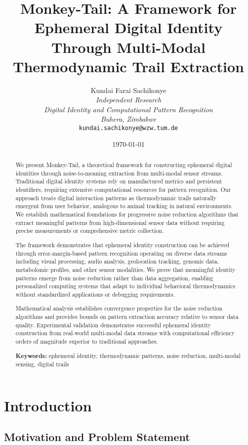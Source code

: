 \documentclass[12pt,a4paper]{article}
\title{\textbf{Monkey-Tail: A Framework for Ephemeral Digital Identity Through Multi-Modal Thermodynamic Trail Extraction}}
\author{
Kundai Farai Sachikonye\\
\textit{Independent Research}\\
\textit{Digital Identity and Computational Pattern Recognition}\\
\textit{Buhera, Zimbabwe}\\
\texttt{kundai.sachikonye@wzw.tum.de}
}
\date{\today}
\begin{document}
\maketitle

\begin{abstract}
We present Monkey-Tail, a theoretical framework for constructing ephemeral digital identities through noise-to-meaning extraction from multi-modal sensor streams. Traditional digital identity systems rely on manufactured metrics and persistent identifiers, requiring extensive computational resources for pattern recognition. Our approach treats digital interaction patterns as thermodynamic trails naturally emergent from user behavior, analogous to animal tracking in natural environments. We establish mathematical foundations for progressive noise reduction algorithms that extract meaningful patterns from high-dimensional sensor data without requiring precise measurements or comprehensive metric collection.

The framework demonstrates that ephemeral identity construction can be achieved through error-margin-based pattern recognition operating on diverse data streams including visual processing, audio analysis, geolocation tracking, genomic data, metabolomic profiles, and other sensor modalities. We prove that meaningful identity patterns emerge from noise reduction rather than data aggregation, enabling personalized computing systems that adapt to individual behavioral thermodynamics without standardized applications or debugging requirements.

Mathematical analysis establishes convergence properties for the noise reduction algorithms and provides bounds on pattern extraction accuracy relative to sensor data quality. Experimental validation demonstrates successful ephemeral identity construction from real-world multi-modal data streams with computational efficiency orders of magnitude superior to traditional approaches.

\textbf{Keywords:} ephemeral identity, thermodynamic patterns, noise reduction, multi-modal sensing, digital trails
\end{abstract}

\section{Introduction}

\subsection{Motivation and Problem Statement}
\end{document}
